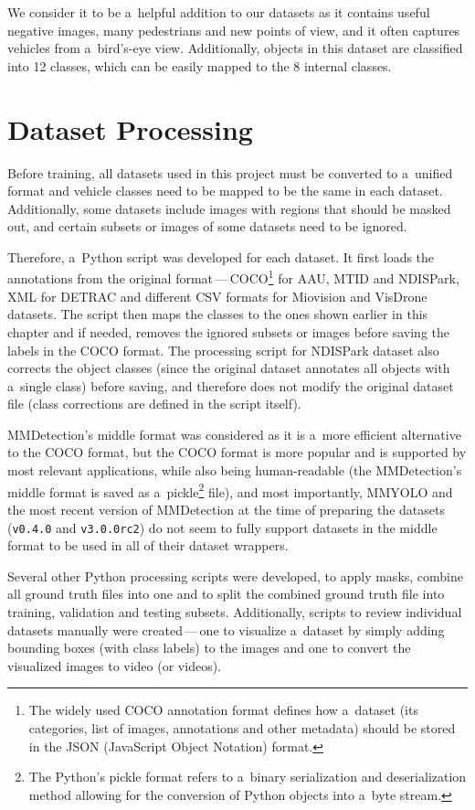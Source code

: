 We consider it to be a~helpful addition to our datasets as it contains useful
negative images, many pedestrians and new points of view, and it often captures
vehicles from a~bird's-eye view. Additionally, objects in this dataset are
classified into 12 classes, which can be easily mapped to the 8
internal classes.


\section{Dataset Processing}

Before training, all datasets used in this project must be converted to
a~unified format and vehicle classes need to be mapped to be the same in each dataset.
Additionally, some datasets include images with regions that should be masked
out, and certain subsets or images of some datasets need to be ignored.

Therefore, a~Python script was developed for each dataset. It first loads the
annotations from the original format\,---\,COCO\footnote{The widely used COCO
annotation format defines how a~dataset (its categories, list of images,
annotations and other metadata) should be stored in the JSON (JavaScript Object
Notation) format.} for AAU, MTID
and NDISPark, XML for DETRAC and different CSV formats for Miovision and VisDrone datasets.
The script then maps the classes to the ones shown earlier in this chapter and if
needed, removes the ignored subsets or images before saving the labels in the
COCO format. The processing script for NDISPark dataset also corrects the object
classes (since the original dataset annotates all objects with a~single class)
before saving, and therefore does not modify the original dataset file (class
corrections are defined in the script itself).

MMDetection's middle format was considered as it is a~more efficient alternative
to the COCO format, but the COCO format is more popular and is supported by most
relevant applications, while also being human-readable (the MMDetection's middle
format is saved as a~pickle\footnote{The Python's pickle format refers to
a~binary serialization and deserialization method allowing for the conversion of
Python objects into a~byte stream.} file), and most importantly, MMYOLO and the
most recent version of MMDetection at the time of preparing the datasets
(\texttt{v0.4.0} and \texttt{v3.0.0rc2}) do not seem to fully support datasets
in the middle format to be used in all of their dataset wrappers.

Several other Python processing scripts were developed, to apply masks, combine
all ground truth files into one and to split the combined ground truth file into
training, validation and testing subsets. Additionally, scripts to review
individual datasets manually were created\,---\,one to visualize a~dataset by simply
adding bounding boxes (with class labels) to the images and one to convert the
visualized images to video (or videos).

